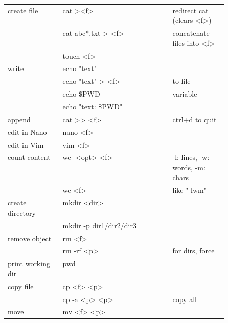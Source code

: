 {\begin{tabularx}{\linewidth}{@{} p{0.25\linewidth}>{\ttfamily}lp{0.25\linewidth} @{}}
        create file          & cat ><f>                   & redirect cat (clears <f>)        \\
                             & cat abc*.txt > <f>         & concatenate files into <f>       \\
                             & touch <f>                  &                                  \\
        write                & echo "text"                &                                  \\
                             & echo "text" > <f>          & to file                          \\
                             & echo \$PWD                 & variable                         \\
                             & echo "text: \$PWD"         &                                  \\
        append               & cat >> <f>                 & ctrl+d to quit                   \\
        edit in Nano         & nano <f>                   &                                  \\
        edit in Vim          & vim <f>                    &                                  \\
        count content        & wc -<opt> <f>              & -l: lines, -w: words, -m: chars  \\
                             & wc <f>                     & like "-lwm"                      \\
        create directory     & mkdir <dir>                &                                  \\
                             & mkdir -p dir1/dir2/dir3    &                                  \\
        remove object        & rm <f>                     &                                  \\
                             & rm -rf <p>                 & for dirs, force                  \\
        print working dir    & pwd                        &                                  \\
        copy file            & cp <f> <p>                 &                                  \\
                             & cp -a <p> <p>              & copy all                         \\
        move                 & mv <f> <p>                 &                                  \\

\end{tabularx}}
